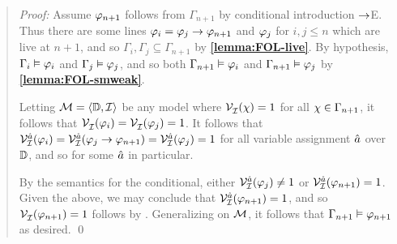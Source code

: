 \begin{quote} 
  \textit{Proof:} Assume $\varphi_{n+1}$ follows from $\Gamma_{n+1}$ by conditional introduction $\rightarrow$E.
  Thus there are some lines $\varphi_i=\varphi_j\rightarrow\varphi_{n+1}$ and $\varphi_j$ for $i,j\leq n$ which are live at $n+1$, and so $\Gamma_i,\Gamma_j\subseteq\Gamma_{n+1}$ by \textbf{\ref{lemma:FOL-live}}.
  By hypothesis, $\Gamma_i\vDash \varphi_i$ and $\Gamma_j\vDash \varphi_j$, and so both $\Gamma_{n+1} \vDash \varphi_i$ and $\Gamma_{n+1} \vDash \varphi_j$ by \textbf{\ref{lemma:FOL-smweak}}.

  Letting $\mathcal{M}=\langle\mathbb{D},\mathcal{I}\rangle$ be any model where $\mathcal{V}_{\mathcal{I}}^{}(\chi) = 1$ for all $\chi \in \Gamma_{n+1}$, it follows that $\mathcal{V}_{\mathcal{I}}^{}(\varphi_i) = \mathcal{V}_{\mathcal{I}}^{}(\varphi_j) = 1$.
  It follows that $\mathcal{V}_{\mathcal{I}}^{\hat{a}}(\varphi_i)=\mathcal{V}_{\mathcal{I}}^{\hat{a}}(\varphi_j\rightarrow\varphi_{n+1})=\mathcal{V}_{\mathcal{I}}^{\hat{a}}(\varphi_j)=1$ for all variable assignment $\hat{a}$ over $\mathbb{D}$, and so for some $\hat{a}$ in particular.

  By the semantics for the conditional, either $\mathcal{V}_{\mathcal{I}}^{\hat{a}}(\varphi_j)\neq 1$ or $\mathcal{V}_{\mathcal{I}}^{\hat{a}}(\varphi_{n+1})=1$.
  Given the above, we may conclude that $\mathcal{V}_{\mathcal{I}}^{\hat{a}}(\varphi_{n+1})=1$, and so $\mathcal{V}_{\mathcal{I}}^{}(\varphi_{n+1})=1$ follows by  .
  Generalizing on $\mathcal{M}$, it follows that $\Gamma_{n+1} \vDash \varphi_{n+1}$ as desired.
  \qed
\end{quote}






